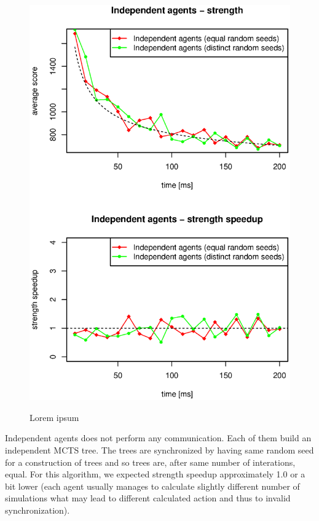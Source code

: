 \begin{figure}
\begin{center}
\includegraphics{img/dummy-ghosts-strength.eps}
\end{center}
\caption{\footnotesize Lorem ipsum}{\footnotesize }
\label{fig_independent_agents_strength}
\end{figure}

Independent agents does not perform any communication. Each of them build an independent MCTS
tree. The trees are synchronized by having same random seed for a construction of trees and so
trees are, after same number of interations, equal. For this algorithm, we expected strength
speedup approximately 1.0 or a bit lower (each agent usually manages to calculate slightly
different number of simulations what may lead to different calculated action and thus to
invalid synchronization).

